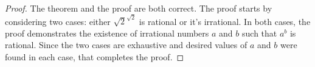 \documentclass[12pt]{amsart}
\theoremstyle{definition}
\theoremstyle{remark}
\begin{document}
\begin{proof}
The theorem and the proof are both correct.
The proof starts by considering two cases: either $\sqrt{2}^{\sqrt{2}}$ is rational or it's irrational.
In both cases, the proof demonstrates the existence of irrational numbers $a$ and $b$ such that $a^b$ is rational.
Since the two cases are exhaustive and desired values of $a$ and $b$ were found in each case, that completes the proof.
\end{proof}
\end{document}
